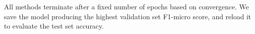 

All methods terminate after a fixed number of epochs based on convergence.
We save the model producing the highest validation set F1-micro score, and reload it to evaluate the test set accuracy. 

